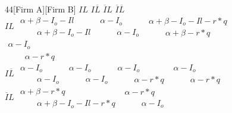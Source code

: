 \documentclass[10.5pt]{article}
\begin{document}
\begin{figure}[ h!]
\begin{center} 
\begin{footnotesize}
\begin{game}{4}{4}[Firm A][Firm B]
       						 \> $IL$  	\> $I\overline{L}$ 	\> $\overline{I}L$  \> $\overline{I}\overline{L}$   \\
$IL$     					 \> $\begin{array}{l}\alpha+\beta-I_{o}-I{l} \\[0.0mm]\phantom{--}\alpha+\beta-I_{o}-I{l} \end{array}$
							 \> $\begin{array}{l}\alpha-I_{o} \\[0.0mm]\phantom{--}\alpha-I_{o} \end{array}$
							 \> $\begin{array}{l}\alpha+\beta-I_{o}-I{l}-r*q \\[0.0mm]\phantom{--}\alpha+\beta-r*q \end{array}$
							 \> $\begin{array}{l}\alpha-I_{o} \\[0.0mm]\phantom{--}\alpha-r*q \end{array}$
							 \\$I\overline{L}$
							  \> $\begin{array}{l}\alpha-I_{o} \\[0.0mm]\phantom{--}\alpha-I_{o} \end{array}$
							  \> $\begin{array}{l}\alpha-I_{o} \\[0.0mm]\phantom{--}\alpha-I_{o} \end{array}$
							  \> $\begin{array}{l}\alpha-I_{o} \\[0.0mm]\phantom{--}\alpha-r*q \end{array}$
							  \> $\begin{array}{l}\alpha-I_{o} \\[0.0mm]\phantom{--}\alpha-r*q \end{array}$
							  \\$\overline{I}L$   
							  \> $\begin{array}{l}\alpha+\beta-r*q \\[0.0mm]\phantom{--}\alpha+\beta-I_{o}-I{l}-r*q \end{array}$
							  \> $\begin{array}{l}\alpha-r*q \\[0.0mm]\phantom{--}\alpha-I_{o} \end{array}$ 

\end{game}
\end{footnotesize}
\end{center}
\end{figure}
\end{document}
